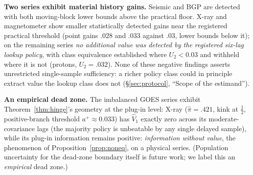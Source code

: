 \documentclass[11pt]{article}
\begin{document}
\textbf{Two series exhibit material history gains.} Seismic and BGP are
detected with both moving-block lower bounds above the practical floor. X-ray
and magnetometer show smaller statistically detected gains near the
registered practical threshold (point gains $.028$ and $.033$ against
$.03$, lower bounds below it); on the remaining series \emph{no
additional value was detected by the registered six-lag lookup policy},
with class equivalence established where $U_2<0.03$ and withheld
where it is not (protons, $U_2=.032$). None of these negative findings
asserts unrestricted single-sample sufficiency: a richer policy class
could in principle extract value the lookup class does not
(\S\ref{sec:protocol}, ``Scope of the estimand'').

\textbf{An empirical dead zone.} The imbalanced GOES series exhibit
Theorem~\ref{thm:hinge}'s geometry at the plug-in level: X-ray
($\hat\pi=.421$, kink at $\tfrac12$, positive-branch threshold
$a^+\approx0.033$) has $\widehat V_1$ exactly zero across its
moderate-covariance lags (the majority policy is unbeatable by any
single delayed sample), while its plug-in information remains positive:
\emph{information without value}, the phenomenon of
Proposition~\ref{prop:noneq}, on a physical series. (Population
uncertainty for the dead-zone boundary itself is future work; we label
this an \emph{empirical} dead zone.)
\end{document}
